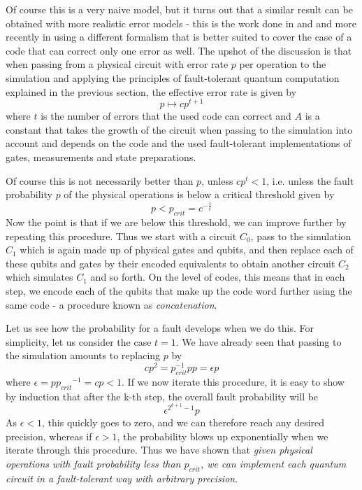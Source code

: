 \documentclass[a4paper, draft]{article}
\theoremstyle{own}
\theoremstyle{remark}
\begin{document}
Of course this is a very naive model, but it turns out that a similar result can be obtained with more realistic error models - this is the work done in  \cite{AharonovOr} and  \cite{KnillLaflammeZurek} and more recently in \cite{AliferisGottesmanPreskill} using a different formalism that is better suited to cover the case of a code that can correct only one error as well. The upshot of the discussion is that when passing from a physical circuit with error rate $p$ per operation to the simulation and applying the principles of fault-tolerant quantum computation explained in the previous section, the effective error rate is given by
$$
p \mapsto c p^{t+1}
$$
where $t$ is the number of errors that the used code can correct and $A$ is a constant that takes the growth of the circuit when passing to the simulation into account and depends on the code and the used fault-tolerant implementations of gates, measurements and state preparations.

Of course this is not necessarily better than $p$, unless $c p^t < 1$, i.e. unless the fault probability $p$ of the physical operations is below a critical threshold given by 
$$
p < p_{crit} = c^{-\frac{1}{t}}
$$
Now the point is that if we are below this threshold, we can improve further by repeating this procedure. Thus we start with a circuit $C_0$, pass to the simulation$C_1$ which is again made up of physical gates and qubits, and then replace each of these qubits and gates by their encoded equivalents to obtain another circuit $C_2$ which simulates $C_1$ and so forth. On the level of codes, this means that in each step, we encode each of the qubits that make up the code word further using the same code - a procedure known as \emph{concatenation}.

Let us see how the probability for a fault develops when we do this. For simplicity, let us consider the case $t = 1$. We have already seen that passing to the simulation amounts to replacing $p$ by 
$$
c p^2 =  p_{crit}^{-1} p p = \epsilon p
$$
where $\epsilon = p{p_{crit}}^{-1} = cp < 1$. If we now iterate this procedure, it is easy to show by induction that after the k-th step, the overall fault probability will be
$$
\epsilon^{2^{k+1}-1} p 
$$
As $\epsilon < 1$, this quickly goes to zero, and we can therefore reach any desired precision, whereas if $\epsilon > 1$, the probability blows up exponentially when we iterate through this procedure. Thus we have shown that \emph{given physical operations with fault probability less than $p_{crit}$, we can implement each quantum circuit in a fault-tolerant way with arbitrary precision}. 
\end{document}
